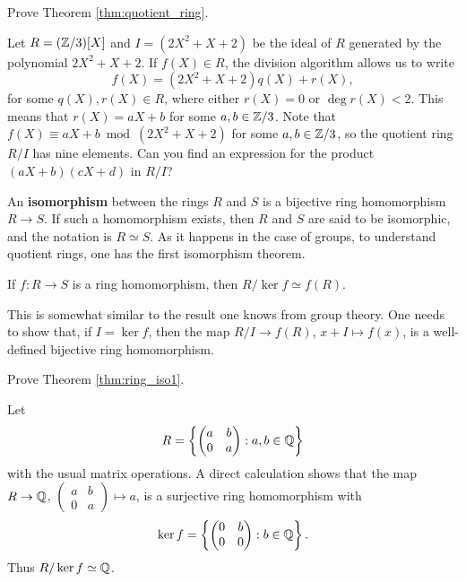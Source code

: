 \begin{exercise}
    Prove Theorem \ref{thm:quotient_ring}.
\end{exercise}

\begin{example}
	Let $R=(\mathbb{Z}/3)[X]$ and $I=(2X^2+X+2)$ be the ideal of $R$ 
	generated by the polynomial $2X^2+X+2$. 	If $f(X)\in R$, 
	the division algorithm allows us to write
	\[
	f(X)=(2X^2+X+2)q(X)+r(X),
	\]
	for some $q(X),r(X)\in R$, where either $r(X)=0$ or $\deg r(X)<2$. 
	This means
	that $r(X)=aX+b$ for some $a,b\in\mathbb{Z}/3$.
	Note that
	$f(X)\equiv aX+b\bmod (2X^2+X+2)$
	for some $a,b\in\mathbb{Z}/3$, 
	so the quotient ring $R/I$ has 
	nine elements.  Can you find an expression for the product 
	$(aX+b)(cX+d)$ in $R/I$?
\end{example}

An \textbf{isomorphism} between the rings $R$ and $S$ is a bijective
ring homomorphism $R\to S$. If such a homomorphism exists, then $R$ and $S$ are said to be isomorphic, and the notation is 
$R\simeq S$. As it happens in the case of groups, 
to understand quotient rings, one has 
the first isomorphism theorem. 

\begin{theorem}
\label{thm:ring_iso1}
	If $f\colon R\to S$ is a ring homomorphism, then $R/\ker f\simeq f(R)$.  	
\end{theorem}

This is somewhat similar to the result one knows from group theory. 
One needs to show that, if $I=\ker f$, then 
the map $R/I\to f(R)$, $x+I\mapsto f(x)$, is a well-defined 
bijective ring homomorphism. 

\begin{exercise}
    Prove Theorem \ref{thm:ring_iso1}.
\end{exercise}

\begin{example}
Let 
\[
R=\left\{\begin{pmatrix}
a&b\\
0&a
\end{pmatrix}:a,b\in\mathbb{Q}\right\}
\]
with the usual matrix operations. 
A direct calculation shows that the map $R\to\mathbb{Q}$, $\begin{pmatrix}a&b\\0&a\end{pmatrix}\mapsto a$, is a surjective 
ring homomorphism with  
\[
\ker f=\left\{\begin{pmatrix}
0&b\\
0&0\end{pmatrix}:b\in\mathbb{Q}\right\}.
\]
Thus $R/\ker f\simeq\mathbb{Q}$. 	
\end{example}


